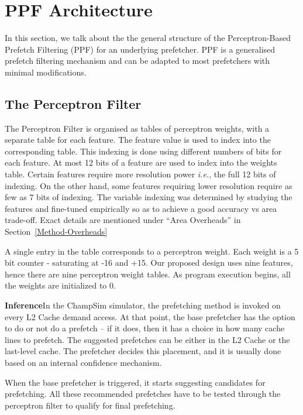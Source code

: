 \section{PPF Architecture}
\label{Arch}

In this section, we talk about the the general structure of the 
Perceptron-Based Prefetch Filtering (PPF) for an underlying prefetcher.  
PPF is a generalised prefetch filtering mechanism and can be adapted to 
most prefetchers with minimal modifications. 

\subsection{The Perceptron Filter}
\label{Arch-Perceptron}
The Perceptron Filter is organised as tables of perceptron weights, 
with a separate table for each feature.  
The feature value is used to index into the corresponding table.
This indexing is done using different numbers of bits for each feature.  
At most 12 bits of a feature are used to index into the
weights table.  Certain features require more resolution power
\textit{i.e.}, the full 12 bits of indexing.  On the other hand, some
features requiring lower resolution require as few as 7 bits of
indexing.  The variable indexing was determined by studying the
features and fine-tuned empirically so as to achieve a good accuracy
vs area trade-off.  Exact details are mentioned under ``Area Overheads''
in Section~\ref{Method-Overheads}

A single entry in the table corresponds to a perceptron weight.  Each
weight is a 5 bit counter - saturating at -16 and +15.  
Our proposed design uses nine features, hence there are nine perceptron 
weight tables. As program execution begins, all the weights are initialized to 0.

\textbf{Inference}\newline In the ChampSim simulator, the prefetching method is 
invoked on every L2 Cache demand access.  At that point, the base prefetcher
has the option to do or not do a prefetch -- if it does, then it has a choice
in how many cache lines to prefetch.  The suggested prefetches can be either
in the L2 Cache or the last-level cache.  The prefetcher decides this
placement, and it is usually done based on an internal confidence mechanism.

When the base prefetcher is triggered, it starts suggesting candidates for
prefetching.  All these recommended prefetches have to be tested through the perceptron
filter to qualify for final prefetching.

